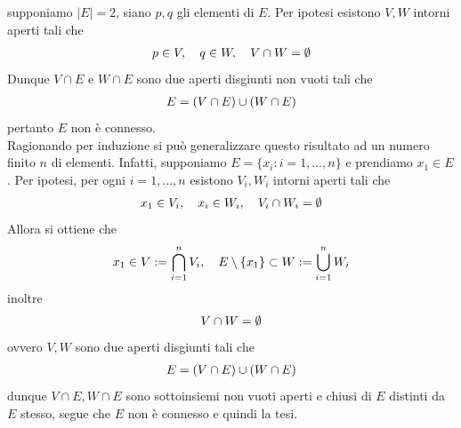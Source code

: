 \documentclass[oneside, 11pt]{amsbook}
\makeatletter
\newcommand{\0}{{(0)}}
\newcommand{\3}{{(3)}}
\theoremstyle{colonplain}
\theoremstyle{colondefinition}
\theoremstyle{colonremark}
\numberwithin{equation}{chapter}
\renewcommand{\proofname}{Dimostrazione}
\renewenvironment{proof}[1][\proofname]{\par
  \pushQED{\qed}%
  \normalfont \topsep6\p@\@plus6\p@\relax
  \trivlist
  \item[\hskip\labelsep\bfseries #1:]\ignorespaces
}{%
  \popQED\endtrivlist\@endpefalse
}
\makeatother
\begin{document}
\begin{proof}
supponiamo $|E| = 2$, siano $p, q$ gli elementi di $E$. Per ipotesi esistono $V, W$ intorni aperti tali che
\begin{align}
    p \in V, \quad q \in W, \quad V \cap W = \emptyset \notag
\end{align}
Dunque $V \cap E$ e $W \cap E$ sono due aperti disgiunti non vuoti tali che
\begin{align}
    E = (V \cap E) \cup (W \cap E) \notag
\end{align}
pertanto $E$ non è connesso. \\
Ragionando per induzione si può generalizzare questo risultato ad un numero finito $n$ di elementi. Infatti, supponiamo $E = \{ x_i : i = 1, \dots, n \}$ e prendiamo $x_1 \in E$. Per ipotesi, per ogni $i = 1, \dots, n$ esistono $V_i, W_i$ intorni aperti tali che
\begin{align}
    x_1 \in V_i, \quad x_i \in W_i, \quad V_i \cap W_i = \emptyset \notag
\end{align}
Allora si ottiene che
\begin{align}
    x_1 \in V := \bigcap_{i = 1}^n V_i, \quad E \setminus \{ x_1 \} \subset W := \bigcup_{i = 1}^n W_i \notag
\end{align}
inoltre
\begin{align}
    V \cap W = \emptyset \notag
\end{align}
ovvero $V, W$ sono due aperti disgiunti tali che
\begin{align}
    E = (V \cap E) \cup (W \cap E) \notag
\end{align}
dunque $V \cap E, W \cap E$ sono sottoinsiemi non vuoti aperti e chiusi di $E$ distinti da $E$ stesso, segue che $E$ non è connesso e quindi la tesi.
\end{proof}
\end{document}
